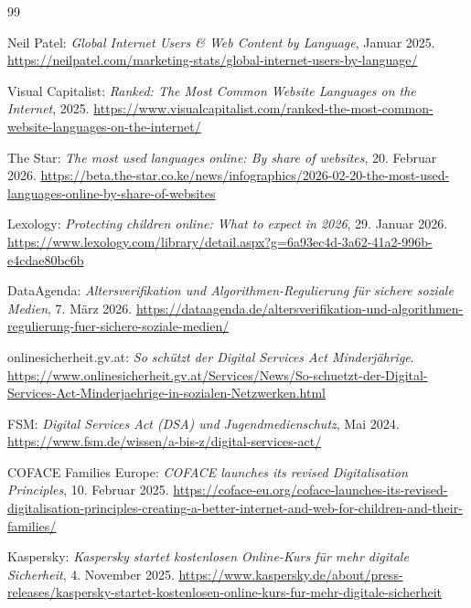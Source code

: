 \documentclass[11pt,a4paper]{article}
\begin{document}
	\begin{thebibliography}{99}
		
		 Neil Patel: \textit{Global Internet Users \& Web Content by Language}, Januar 2025. \url{https://neilpatel.com/marketing-stats/global-internet-users-by-language/}
		
		 Visual Capitalist: \textit{Ranked: The Most Common Website Languages on the Internet}, 2025. \url{https://www.visualcapitalist.com/ranked-the-most-common-website-languages-on-the-internet/}
		
		 The Star: \textit{The most used languages online: By share of websites}, 20. Februar 2026. \url{https://beta.the-star.co.ke/news/infographics/2026-02-20-the-most-used-languages-online-by-share-of-websites}
		
		 Lexology: \textit{Protecting children online: What to expect in 2026}, 29. Januar 2026. \url{https://www.lexology.com/library/detail.aspx?g=6a93ec4d-3a62-41a2-996b-e4cdae80bc6b}
		
		 DataAgenda: \textit{Altersverifikation und Algorithmen-Regulierung für sichere soziale Medien}, 7. März 2026. \url{https://dataagenda.de/altersverifikation-und-algorithmen-regulierung-fuer-sichere-soziale-medien/}
		
		 onlinesicherheit.gv.at: \textit{So schützt der Digital Services Act Minderjährige}. \url{https://www.onlinesicherheit.gv.at/Services/News/So-schuetzt-der-Digital-Services-Act-Minderjaehrige-in-sozialen-Netzwerken.html}
		
		 FSM: \textit{Digital Services Act (DSA) und Jugendmedienschutz}, Mai 2024. \url{https://www.fsm.de/wissen/a-bis-z/digital-services-act/}
		
		 COFACE Families Europe: \textit{COFACE launches its revised Digitalisation Principles}, 10. Februar 2025. \url{https://coface-eu.org/coface-launches-its-revised-digitalisation-principles-creating-a-better-internet-and-web-for-children-and-their-families/}
		
		 Kaspersky: \textit{Kaspersky startet kostenlosen Online-Kurs für mehr digitale Sicherheit}, 4. November 2025. \url{https://www.kaspersky.de/about/press-releases/kaspersky-startet-kostenlosen-online-kurs-fur-mehr-digitale-sicherheit}
		

\end{thebibliography}
\end{document}
